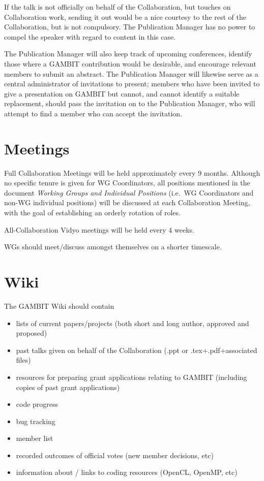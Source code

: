 If the talk is not officially on behalf of the Collaboration, but touches on Collaboration work, sending it out would be a nice courtesy to the rest of the Collaboration, but is not compulsory.  The Publication Manager has no power to compel the speaker with regard to content in this case.

The Publication Manager will also keep track of upcoming conferences, identify those where a GAMBIT contribution would be desirable, and encourage relevant members to submit an abstract.  The Publication Manager will likewise serve as a central administrator of invitations to present; members who have been invited to give a presentation on GAMBIT but cannot, and cannot identify a suitable replacement, should pass the invitation on to the Publication Manager, who will attempt to find a member who can accept the invitation.


\section{Meetings}

Full Collaboration Meetings will be held approximately every 9 months.  Although no specific tenure is given for WG Coordinators, all positions mentioned in the document \textit{Working Groups and Individual Positions} (i.e.\ WG Coordinators and non-WG individual positions) will be discussed at each Collaboration Meeting, with the goal of establishing an orderly rotation of roles.

All-Collaboration Vidyo meetings will be held every 4 weeks.

WGs should meet/discuss amongst themselves on a shorter timescale.  


\section{Wiki}

The GAMBIT Wiki should contain 
\begin{itemize}
\item lists of current papers/projects (both short and long author, approved and proposed)
\item past talks given on behalf of the Collaboration (.ppt or .tex+.pdf+associated files)
\item resources for preparing grant applications relating to GAMBIT (including copies of past grant applications)
\item code progress
\item bug tracking
\item member list
\item recorded outcomes of official votes (new member decisions, etc)
\item information about / links to coding resources (OpenCL, OpenMP, etc)
\end{itemize}


